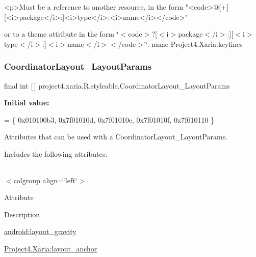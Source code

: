 \begin{DoxyVerb}      <p>Must be a reference to another resource, in the form "<code>@[+][<i>package</i>:]<i>type</i>:<i>name</i></code>"
\end{DoxyVerb}
 or to a theme attribute in the form \char`\"{}$<$code$>$?\mbox{[}$<$i$>$package$<$/i$>$\+:\mbox{]}\mbox{[}$<$i$>$type$<$/i$>$\+:\mbox{]}$<$i$>$name$<$/i$>$$<$/code$>$\char`\"{}.  name Project4.\+Xaria\+:keylines \mbox{\label{classproject4_1_1xaria_1_1R_1_1styleable_ad7c97c688ef4dae4ebe89418a84dab5d}} 
\subsubsection{\texorpdfstring{Coordinator\+Layout\+\_\+\+Layout\+Params}{CoordinatorLayout\_LayoutParams}}
{\footnotesize\ttfamily final int \mbox{[}$\,$\mbox{]} project4.\+xaria.\+R.\+styleable.\+Coordinator\+Layout\+\_\+\+Layout\+Params\hspace{0.3cm}{\ttfamily [static]}}

{\bfseries Initial value\+:}
\begin{DoxyCode}
= \{
            0x010100b3, 0x7f01010d, 0x7f01010e, 0x7f01010f,
            0x7f010110
        \}
\end{DoxyCode}
Attributes that can be used with a Coordinator\+Layout\+\_\+\+Layout\+Params. 

Includes the following attributes\+:

\tabulinesep=1mm
\begin{longtabu} spread 0pt [c]{*{0}{|X[-1]}|}
\hline
\end{longtabu}
$<$colgroup align=\char`\"{}left\char`\"{}$>$ 

Attribute

Description 

{\ttfamily \hyperlink{classproject4_1_1xaria_1_1R_1_1styleable_aa0d36210c51f5ae4879714ecc8f3fdbd}{android\+:layout\+\_\+gravity}}

{\ttfamily \hyperlink{classproject4_1_1xaria_1_1R_1_1styleable_acd12b16f8a05e1b4ae6a327d285ff2e0}{Project4.\+Xaria\+:layout\+\_\+anchor}}

